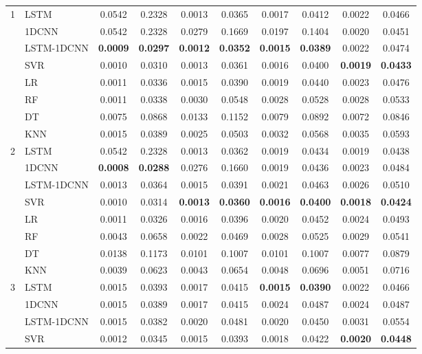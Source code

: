 {\begin{longtable}{clcccccccc}
  1 & LSTM & 0.0542 & 0.2328 & 0.0013 & 0.0365 & 0.0017 & 0.0412 & 0.0022 & 0.0466\\
    & 1DCNN & 0.0542 & 0.2328 & 0.0279 & 0.1669 &  0.0197 & 0.1404 & 0.0020 & 0.0451 \\
    & LSTM-1DCNN & \textbf{0.0009} & \textbf{0.0297} & \textbf{0.0012} & \textbf{0.0352} & \textbf{0.0015} & \textbf{0.0389} & 0.0022 & 0.0474 \\
    & SVR & 0.0010 & 0.0310 &  0.0013 & 0.0361 & 0.0016 & 0.0400 & \textbf{0.0019} & \textbf{0.0433} \\
    & LR & 0.0011 & 0.0336 & 0.0015 & 0.0390 & 0.0019 & 0.0440 & 0.0023 & 0.0476  \\
    & RF & 0.0011 & 0.0338 & 0.0030 & 0.0548 & 0.0028 & 0.0528 & 0.0028 & 0.0533 \\
    & DT & 0.0075 & 0.0868 & 0.0133 & 0.1152 & 0.0079 & 0.0892 & 0.0072 & 0.0846 \\
    & KNN & 0.0015 & 0.0389 & 0.0025 & 0.0503 & 0.0032 & 0.0568 & 0.0035 & 0.0593 \\
  \hline
  2 & LSTM & 0.0542 & 0.2328 & 0.0013 & 0.0362 & 0.0019 & 0.0434 & 0.0019 & 0.0438  \\
    & 1DCNN & \textbf{0.0008} & \textbf{0.0288} & 0.0276 & 0.1660 & 0.0019 & 0.0436 & 0.0023 & 0.0484 \\
    & LSTM-1DCNN & 0.0013 & 0.0364 & 0.0015 & 0.0391 & 0.0021 & 0.0463 & 0.0026 & 0.0510 \\
    & SVR & 0.0010 & 0.0314 & \textbf{0.0013} & \textbf{0.0360} & \textbf{0.0016} & \textbf{0.0400} & \textbf{0.0018} & \textbf{0.0424} \\
    & LR & 0.0011 & 0.0326 & 0.0016 & 0.0396 & 0.0020 & 0.0452 & 0.0024 & 0.0493 \\
    & RF & 0.0043 & 0.0658 & 0.0022 & 0.0469 & 0.0028 & 0.0525 & 0.0029 & 0.0541 \\
    & DT & 0.0138 & 0.1173 & 0.0101 & 0.1007 & 0.0101 & 0.1007 & 0.0077 & 0.0879 \\
    & KNN & 0.0039 & 0.0623 & 0.0043 & 0.0654 & 0.0048 & 0.0696 & 0.0051 & 0.0716 \\
  \hline
  3 & LSTM & 0.0015 & 0.0393 & 0.0017 & 0.0415 & \textbf{0.0015} & \textbf{0.0390} & 0.0022 & 0.0466 \\
    & 1DCNN & 0.0015 & 0.0389 & 0.0017 & 0.0415 & 0.0024 & 0.0487 & 0.0024 & 0.0487 \\
    & LSTM-1DCNN & 0.0015 & 0.0382 & 0.0020 & 0.0481 & 0.0020 & 0.0450 & 0.0031 & 0.0554 \\
    & SVR & 0.0012 & 0.0345 & 0.0015 & 0.0393 & 0.0018 & 0.0422 & \textbf{0.0020} & \textbf{0.0448} \\

\end{longtable}}
